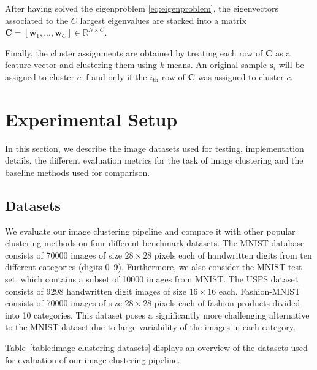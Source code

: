 \documentclass[11pt]{article}
\theoremstyle{definition}
\newcommand{\Eigenvector}[1]{\mathbf{w}_{#1}}
\newcommand{\Sample}[1]{\mathbf{s}_{#1}}
\newcommand{\NumClusters}{C}
\newcommand{\ClusteringMatrix}{\mathbf{C}}
\newcommand{\Table}[1]{Table~\ref{#1}}
\begin{document}
After having solved the eigenproblem \eqref{eq:eigenproblem}, the eigenvectors associated to the $\NumClusters$ largest eigenvalues are stacked into a matrix $\ClusteringMatrix = [\Eigenvector{1}, ..., \Eigenvector{\NumClusters}] \in \mathbb{R}^{N \times \NumClusters}$.

Finally, the cluster assignments are obtained by treating each row of $\ClusteringMatrix$ as a feature vector and clustering them using $k$-means. An original sample $\Sample{i}$ will be assigned to cluster $c$ if and only if the $i_{\text{th}}$ row of $\ClusteringMatrix$ was assigned to cluster $c$.

        

\section{Experimental Setup}\label{sec:experimental setup}

In this section, we describe the image datasets used for testing, implementation details, the different evaluation metrics for the task of image clustering and the baseline methods used for comparison.


\subsection{Datasets}

We evaluate our image clustering pipeline and compare it with other popular clustering methods on four different benchmark datasets. The MNIST \cite{LeCun_MnistDataset_1998} database consists of 70000 images of size $28 \times 28$ pixels each of handwritten digits from ten different categories (digits 0--9). Furthermore, we also consider the MNIST-test set, which contains a subset of 10000 images from MNIST. The USPS dataset \cite{Hull_USPSDataset_1994} consists of 9298 handwritten digit images of size $16 \times 16$ each. Fashion-MNIST \cite{Xiao_FashionMNIST_2017} consists of 70000 images of size $28 \times 28$ pixels each of fashion products divided into 10 categories. This dataset poses a significantly more challenging alternative to the MNIST dataset due to large variability of the images in each category.

\Table{table:image clustering datasets} displays an overview of the datasets used for evaluation of our image clustering pipeline.
\end{document}
